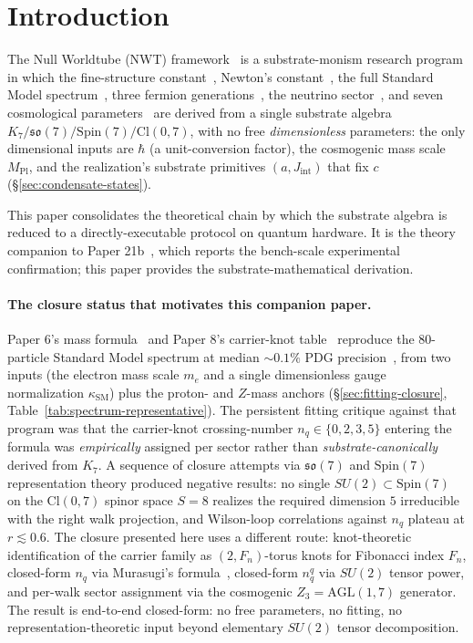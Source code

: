 \documentclass[11pt]{article}
\newcommand{\so}{\mathfrak{so}}
\begin{document}
\section{Introduction}
\label{sec:intro}

The Null Worldtube (NWT) framework~\cite{Paper8a,Paper17,Paper18,Paper19,Paper20} is a substrate-monism research program in which the fine-structure constant~\cite{Paper8a}, Newton's constant~\cite{Paper17}, the full Standard Model spectrum~\cite{Paper6,Paper13}, three fermion generations~\cite{Paper20}, the neutrino sector~\cite{Paper20}, and seven cosmological parameters~\cite{Paper25Memo} are derived from a single substrate algebra $K_7 /\allowbreak \so(7) /\allowbreak \mathrm{Spin}(7) /\allowbreak \mathrm{Cl}(0, 7)$, with no free \emph{dimensionless} parameters: the only dimensional inputs are $\hbar$ (a unit-conversion factor), the cosmogenic mass scale $M_\text{Pl}$, and the realization's substrate primitives $(a, J_\text{int})$ that fix $c$ (\S\ref{sec:condensate-states}).

This paper consolidates the theoretical chain by which the substrate algebra is reduced to a directly-executable protocol on quantum hardware.  It is the theory companion to Paper 21b~\cite{Paper21b}, which reports the bench-scale experimental confirmation; this paper provides the substrate-mathematical derivation.

\paragraph{The closure status that motivates this companion paper.}
Paper 6's mass formula~\cite{Paper6} and Paper 8's carrier-knot table~\cite{Paper8} reproduce the $80$-particle Standard Model spectrum at median $\sim 0.1\%$ PDG precision~\cite{Paper13}, from two inputs (the electron mass scale $m_e$ and a single dimensionless gauge normalization $\kappa_\text{SM}$) plus the proton- and $Z$-mass anchors (\S\ref{sec:fitting-closure}, Table~\ref{tab:spectrum-representative}).  The persistent fitting critique against that program was that the carrier-knot crossing-number $n_q \in \{0, 2, 3, 5\}$ entering the formula was \emph{empirically} assigned per sector rather than \emph{substrate-canonically} derived from $K_7$.  A sequence of closure attempts via $\so(7)$ and $\mathrm{Spin}(7)$ representation theory produced negative results: no single $SU(2) \subset \mathrm{Spin}(7)$ on the Cl$(0, 7)$ spinor space $S = 8$ realizes the required dimension $5$ irreducible with the right walk projection, and Wilson-loop correlations against $n_q$ plateau at $r \lesssim 0.6$.  The closure presented here uses a different route: knot-theoretic identification of the carrier family as $(2, F_n)$-torus knots for Fibonacci index $F_n$, closed-form $n_q$ via Murasugi's formula~\cite{Murasugi}, closed-form $n_q^q$ via $SU(2)$ tensor power, and per-walk sector assignment via the cosmogenic $Z_3 = \mathrm{AGL}(1, 7)$ generator.  The result is end-to-end closed-form: no free parameters, no fitting, no representation-theoretic input beyond elementary $SU(2)$ tensor decomposition.
\end{document}
